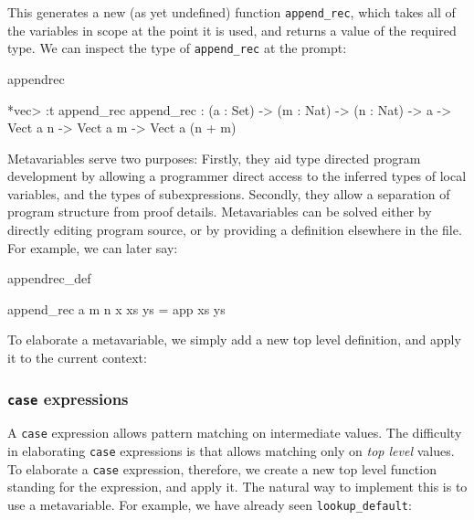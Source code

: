This generates a new (as yet undefined)
function \texttt{append\_rec}, which takes all of the variables
in scope at the point it is used, and returns a value of the required type.
We can inspect the type of \texttt{append\_rec} at the \Idris{} prompt:

\begin{SaveVerbatim}{appendrec}

*vec> :t append_rec
append_rec : (a : Set) -> (m : Nat) -> (n : Nat) -> a -> 
             Vect a n -> Vect a m -> Vect a (n + m)

\end{SaveVerbatim}

Metavariables serve two purposes: Firstly, they aid type directed program development
by allowing a programmer direct access to the inferred types of local variables, and
the types of subexpressions. Secondly, they allow a separation of program structure
from proof details. Metavariables can be solved either by directly editing program
source, or by providing a definition elsewhere in the file. For example, we can later say:

\begin{SaveVerbatim}{appendrec_def}

append_rec a m n x xs ys = app xs ys

\end{SaveVerbatim}

To elaborate a metavariable, we simply add a new top level definition, and apply
it to the current context:


\subsubsection{\texttt{case} expressions}


A \texttt{case} expression allows pattern matching on intermediate values. The difficulty
in elaborating \texttt{case} expressions is that \TT{} allows matching only on
\emph{top level} values. To elaborate a \texttt{case} expression, therefore,
we create a new top level function standing for the expression, and apply it. The natural
way to implement this is to use a metavariable. For example, we have already seen
\texttt{lookup\_default}:

